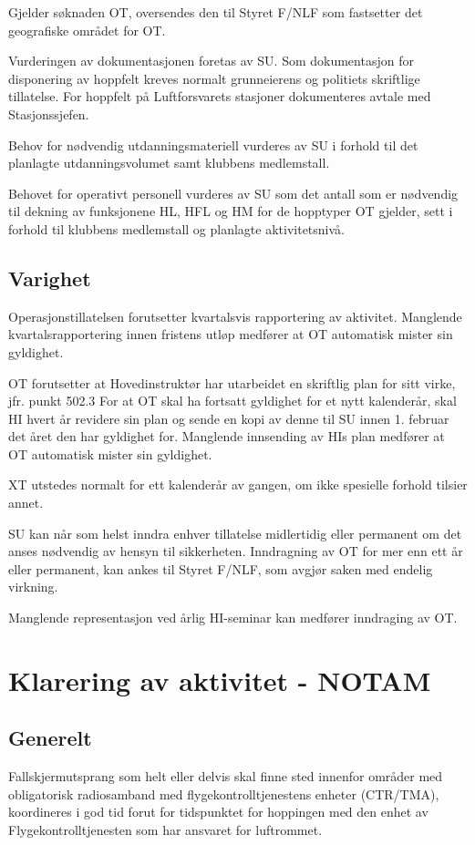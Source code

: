 Gjelder søknaden OT, oversendes den til Styret F/NLF som fastsetter det geografiske området for OT.

Vurderingen av dokumentasjonen foretas av SU. Som dokumentasjon for disponering av hoppfelt kreves normalt grunneierens og politiets skriftlige tillatelse. For hoppfelt på Luftforsvarets stasjoner dokumenteres avtale med Stasjonssjefen.

Behov for nødvendig utdanningsmateriell vurderes av SU i forhold til det planlagte utdanningsvolumet samt klubbens medlemstall.

Behovet for operativt personell vurderes av SU som det antall som er nødvendig til dekning av funksjonene HL, HFL og HM for de hopptyper OT gjelder, sett i forhold til klubbens medlemstall og planlagte aktivitetsnivå.

\subsection{Varighet}
Operasjonstillatelsen forutsetter kvartalsvis rapportering av aktivitet. Manglende kvartalsrapportering innen fristens utløp medfører at OT automatisk mister sin gyldighet.

OT forutsetter at Hovedinstruktør har utarbeidet en skriftlig plan for sitt virke, jfr. punkt 502.3 For at OT skal ha fortsatt gyldighet for et nytt kalenderår, skal HI hvert år revidere sin plan og sende en kopi av denne til SU innen 1. februar det året den har gyldighet for. Manglende innsending av HIs plan medfører at OT automatisk mister sin gyldighet.

XT utstedes normalt for ett kalenderår av gangen, om ikke spesielle forhold tilsier annet.

SU kan når som helst inndra enhver tillatelse midlertidig eller permanent om det anses nødvendig av hensyn til sikkerheten. Inndragning av OT for mer enn ett år eller permanent, kan ankes til Styret F/NLF, som avgjør saken med endelig virkning.

Manglende representasjon ved årlig HI-seminar kan medfører inndraging av OT.

\section{Klarering av aktivitet - NOTAM}
\subsection{Generelt}
Fallskjermutsprang som helt eller delvis skal finne sted innenfor områder med obligatorisk radiosamband med flygekontrolltjenestens enheter (CTR/TMA), koordineres i god tid forut for tidspunktet for hoppingen med den enhet av Flygekontrolltjenesten som har ansvaret for luftrommet.

